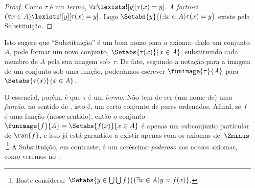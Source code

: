 \documentclass[../../../include/open-logic-section]{subfiles}
\begin{document}
\begin{proof}
Como $\tau$ é um \emph{termo}, $\forall x \lexists![y][\tau(x) = y]$.
\emph{A fortiori}, $(\forall x \in A)\lexists![y][\tau(x) = y]$. Logo
$\Setabs{y}{(\exists x \in A)\tau(x) = y}$ existe pela Substituição.
\end{proof}
\noindent
Isto sugere que ``Substituição'' é um bom nome para o axioma: dado um
conjunto $A$, pode formar um novo conjunto, $\Setabs{\tau(x)}{x \in A}$,
substituindo cada membro de $A$ pela sua imagem sob~$\tau$. De fato,
seguindo a notação para a imagem de um conjunto sob uma função,
poderíamos escrever $\funimage{\tau}{A}$ para $\Setabs{\tau(x)}{x \in A}$.

O essencial, porém, é que $\tau$ é um \emph{termo}. Não tem de ser (um
nome de) uma \emph{função}, no sentido de ,
isto é, um certo conjunto de pares ordenados. Afinal, se $f$ é uma
função (nesse sentido), então o conjunto $\funimage{f}{A} = \Setabs{f(x)}{x \in
A}$ é apenas um subconjunto particular de $\ran{f}$, e isso já está
garantido a existir apenas com os axiomas de~$\Zminus$.\footnote{Baste
considerar $\Setabs{y \in \bigcup \bigcup f}{(\exists x \in A)y =
f(x)}$.} A Substituição, em contraste, é um acréscimo \emph{poderoso} aos
nossos axiomas, como veremos no .
\end{document}
